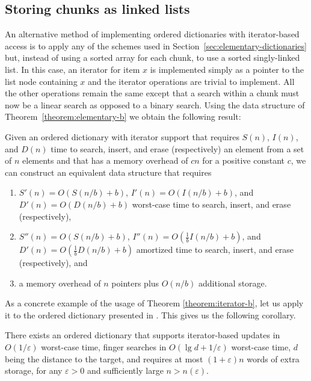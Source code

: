 \documentclass{DIKU-article}
\newcommand{\thmref}[1]{Theorem~\ref{theorem:#1}}
\newcommand{\secref}[1]{\mbox{Section~\ref{sec:#1}}}
\begin{document}
\subsection{Storing chunks as linked lists}

An alternative method of implementing ordered dictionaries with
iterator-based access is to apply any of the schemes used in
\secref{elementary-dictionaries} but, instead of using a sorted array
for each chunk, to use a sorted singly-linked list.  In this case, an
iterator for item $x$ is implemented simply as a pointer to the list
node containing $x$ and the iterator operations are trivial to
implement.  All the other operations remain the same except that a
search within a chunk must now be a linear search as opposed to a
binary search.  Using the data structure of \thmref{elementary-b} we
obtain the following result:

\begin{theorem}
\label{theorem:iterator-b}
Given an ordered dictionary with iterator support that requires 
$S(n)$, $I(n)$, and $D(n)$
time to search, insert, and erase (respectively) an element from a
set of $n$ elements and that has a memory overhead of $cn$ for a
positive constant $c$, we can construct an equivalent data structure
that requires 
\begin{enumerate}
\item $S'(n)=O(S(n/b)+b)$, $I'(n)=O(I(n/b)+b)$,
and $D'(n)=O(D(n/b)+b)$ worst-case time to search, insert,
and erase (respectively), 
\item $S''(n)=O(S(n/b)+b)$,
$I''(n)=O(\frac{1}{b}I(n/b)+b)$, and
$D'(n)=O(\frac{1}{b}D(n/b)+b)$ amortized time to search,
insert, and erase (respectively), and 
\item a memory overhead of
$n$ pointers plus $O(n/b)$ additional storage.
\end{enumerate}
\end{theorem}

As a concrete example of the usage of Theorem
\ref{theorem:iterator-b}, let us apply it to the ordered dictionary
presented in \cite{BLMTT03}. This gives us the following corollary.

\begin{corollary}
\label{corollary:dictionary}
There exists an ordered dictionary that supports iterator-based
updates in $O(1/\varepsilon)$ worst-case time, finger searches in
$O(\lg d + 1/\varepsilon)$ worst-case time, $d$ being the distance to
the target, and requires at most $(1 + \varepsilon)n$ words of
extra storage, for any $\varepsilon > 0$ and sufficiently large
$n > n(\varepsilon)$.
\end{corollary}
\end{document}
